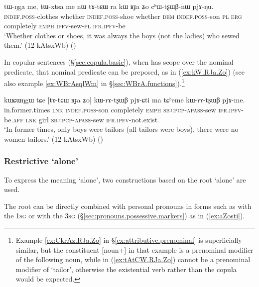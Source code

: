 \begin{exe}
\ex \label{ex:kW.RJa.Zo}
 \gll tɯ-ŋga me, tɯ-xtsa me nɯ tɤ-tɕɯ ra kɯ ʁɟa ʑo cʰɯ-tʂɯβ-nɯ pjɤ-ŋu. \\
 \textsc{indef}.\textsc{poss}-clothes whether  \textsc{indef}.\textsc{poss}-shoe whether \textsc{dem} \textsc{indef}.\textsc{poss}-son \textsc{pl} \textsc{erg} completely \textsc{emph} \textsc{ipfv}-sew-\textsc{pl} \textsc{ifr}.\textsc{ipfv}-be \\
 \glt `Whether clothes or shoes, it was always the boys (not the ladies) who sewed them.' (12-kAtsxWb)
()
\end{exe}

In copular sentences (§\ref{sec:copula.basic}), when  has scope over the nominal predicate, that nominal predicate can be preposed, as in (\ref{ex:kW.RJa.Zo}) (see also example \ref{ex:WBrAsqlWm} in §\ref{sec:WBrA.functions}).\footnote{Example \ref{ex:CkrAz.RJa.Zo} in §\ref{ex:attributive.prenominal} is superficially similar, but the constituent [noun+]  in that example is a prenominal modifier of the following noun, while in (\ref{ex:tAtCW.RJa.Zo})  cannot be a prenominal modifier of  `tailor', otherwise the existential verb  rather than the copula  would be expected. }
  
\begin{exe}
\ex \label{ex:tAtCW.RJa.Zo}
 \gll  kɯɕɯŋgɯ tɕe [tɤ-tɕɯ ʁɟa ʑo] kɯ-rɤ-tʂɯβ pjɤ-ɕti ma tɕʰeme kɯ-rɤ-tʂɯβ pjɤ-me. \\
 in.former.times \textsc{lnk} \textsc{indef}.\textsc{poss}-son completely \textsc{emph} \textsc{sbj}:\textsc{pcp}-\textsc{apass}-sew \textsc{ifr}.\textsc{ipfv}-be.\textsc{aff} \textsc{lnk} girl \textsc{sbj}:\textsc{pcp}-\textsc{apass}-sew \textsc{ifr}.\textsc{ipfv}-not.exist \\
 \glt  `In former times, only boys were tailors (all tailors were boys), there were no women tailors.' (12-kAtsxWb)
()
\end{exe}

\subsubsection{Restrictive `alone'} \label{sec:stWsti}
To express the meaning `alone', two constructions based on the root  `alone' are used.

The root  can be directly combined with personal pronouns in forms such as  with the \textsc{1sg}  or  with the \textsc{3sg}   (§\ref{sec:pronouns.possessive.markers}) as in (\ref{ex:aZosti}).

